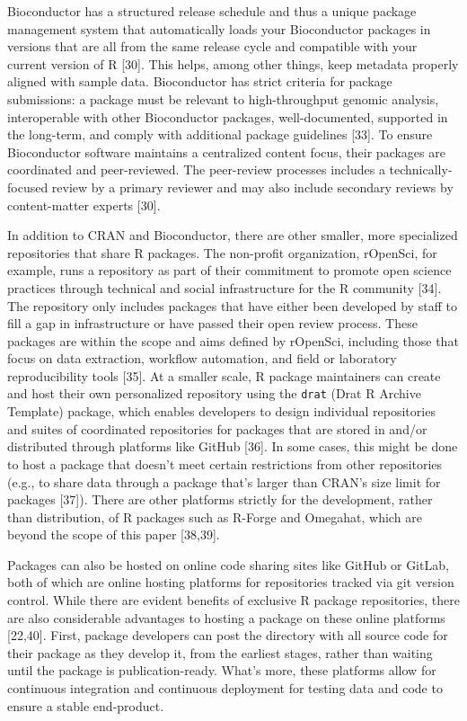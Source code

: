 \documentclass[10pt,letterpaper]{article}
\begin{document}
Bioconductor has a structured release schedule and thus a unique package
management system that automatically loads your Bioconductor packages in
versions that are all from the same release cycle and compatible with
your current version of R {[}30{]}. This helps, among other things, keep
metadata properly aligned with sample data. Bioconductor has strict
criteria for package submissions: a package must be relevant to
high-throughput genomic analysis, interoperable with other Bioconductor
packages, well-documented, supported in the long-term, and comply with
additional package guidelines {[}33{]}. To ensure Bioconductor software
maintains a centralized content focus, their packages are coordinated
and peer-reviewed. The peer-review processes includes a
technically-focused review by a primary reviewer and may also include
secondary reviews by content-matter experts {[}30{]}.

In addition to CRAN and Bioconductor, there are other smaller, more
specialized repositories that share R packages. The non-profit
organization, rOpenSci, for example, runs a repository as part of their
commitment to promote open science practices through technical and
social infrastructure for the R community {[}34{]}. The repository only
includes packages that have either been developed by staff to fill a gap
in infrastructure or have passed their open review process. These
packages are within the scope and aims defined by rOpenSci, including
those that focus on data extraction, workflow automation, and field or
laboratory reproducibility tools {[}35{]}. At a smaller scale, R package
maintainers can create and host their own personalized repository using
the \texttt{drat} (Drat R Archive Template) package, which enables
developers to design individual repositories and suites of coordinated
repositories for packages that are stored in and/or distributed through
platforms like GitHub {[}36{]}. In some cases, this might be done to
host a package that doesn't meet certain restrictions from other
repositories (e.g., to share data through a package that's larger than
CRAN's size limit for packages {[}37{]}). There are other platforms
strictly for the development, rather than distribution, of R packages
such as R-Forge and Omegahat, which are beyond the scope of this paper
{[}38,39{]}.

Packages can also be hosted on online code sharing sites like GitHub or
GitLab, both of which are online hosting platforms for repositories
tracked via git version control. While there are evident benefits of
exclusive R package repositories, there are also considerable advantages
to hosting a package on these online platforms {[}22,40{]}. First,
package developers can post the directory with all source code for their
package as they develop it, from the earliest stages, rather than
waiting until the package is publication-ready. What's more, these
platforms allow for continuous integration and continuous deployment for
testing data and code to ensure a stable end-product.
\end{document}
